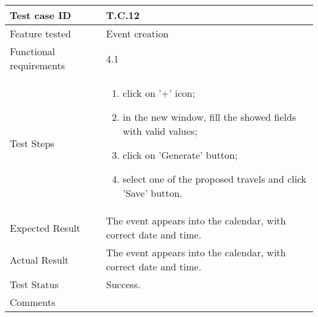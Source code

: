 \begin{table}[H]
	\begin{center}
		\begin{tabular}{ | p{} | p{} | }
		\hline
		Test case ID & T.C.12\\
		\hline
		Feature tested & Event creation\\
		\hline
		Functional requirements & 4.1  \\
    	\hline
		Test Steps & 
			\begin{enumerate}
				\item click on '+' icon;
				\item in the new window, fill the showed fields with valid values;
				\item click on 'Generate' button;
				\item select one of the proposed travels and click 'Save' button. 
			\end{enumerate} \\
		\hline
		Expected Result & The event appears into the calendar, with correct date and time.\\
		\hline
		Actual Result & The event appears into the calendar, with correct date and time.\\ 
		\hline
		Test Status & \color{ForestGreen}Success.\\ 
		\hline
		Comments & \\ 
		\hline
		
		\end{tabular}
	\end{center}
\end{table}

